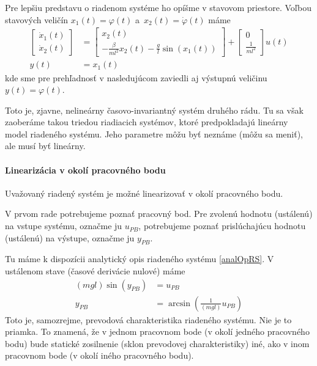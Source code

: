 \documentclass[a4paper, 10pt, ]{article}
\begin{document}
Pre lepšiu predstavu o riadenom systéme ho opíšme v stavovom priestore. Voľbou stavových veličín $x_1(t) = \varphi(t)$ a~$x_2(t) = \dot\varphi(t)$ máme
\begin{subequations} \label{stavopnonlinkyv}
	\begin{align}
		\begin{bmatrix}
			\dot{x}_1(t) \\ \dot{x}_2(t)
		\end{bmatrix}
		&=
		\begin{bmatrix}
			x_2(t) \\ - \frac{\beta}{ml^2} x_2(t) - \frac{g}{l} \sin\left(x_1(t)\right)
		\end{bmatrix}
		+
		\begin{bmatrix}
			0 \\ \frac{1}{ml^2}
		\end{bmatrix}
		u(t) \\
		y(t) &= x_1(t)
	\end{align}
\end{subequations}
kde sme pre prehľadnosť v nasledujúcom zaviedli aj výstupnú veličinu $y(t) = \varphi(t)$.


Toto je, zjavne, nelineárny časovo-invariantný systém druhého rádu. Tu sa však zaoberáme takou triedou riadiacich systémov, ktoré predpokladajú lineárny model riadeného systému. Jeho parametre môžu byť neznáme (môžu sa meniť), ale musí byť lineárny.

\paragraph{Linearizácia v okolí pracovného bodu}

Uvažovaný riadený systém je možné linearizovať v okolí pracovného bodu.

V prvom rade potrebujeme poznať pracovný bod. Pre zvolenú hodnotu (ustálenú) na vstupe systému, označme ju $u_{PB}$, potrebujeme poznať prislúchajúcu hodnotu (ustálenú) na výstupe, označme ju $y_{PB}$.

Tu máme k dispozícii analytický opis riadeného systému \eqref{analOpRS}. V ustálenom stave (časové derivácie nulové) máme
\begin{subequations}
    \begin{align}
        \left(m g l\right)\sin\left(y_{PB}\right) &= u_{PB} \\
         y_{PB} &= \arcsin \left( \frac{1}{ \left(m g l\right)} u_{PB} \right)
    \end{align}
\end{subequations}
Toto je, samozrejme, prevodová charakteristika riadeného systému. Nie je to priamka. To znamená, že v jednom pracovnom bode (v okolí jedného pracovného bodu) bude statické zosilnenie (sklon prevodovej charakteristiky) iné, ako v inom pracovnom bode (v okolí iného pracovného bodu).
\end{document}
